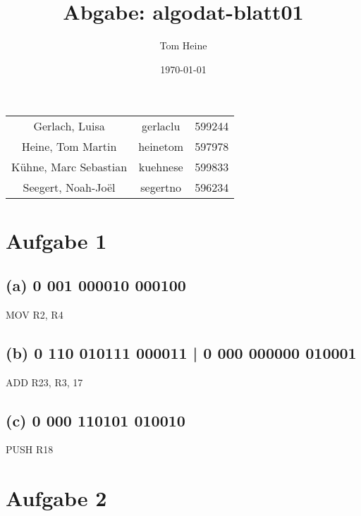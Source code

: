 \documentclass[12pt,a4paper]{scrartcl}
\author{Tom Heine}
\title{Abgabe: algodat-blatt01}
\date{\today}
\begin{document}
	\newpage
	\begin{center}
		\begin{tabular}{ccc}
			Gerlach, Luisa&gerlaclu&599244\\
			Heine, Tom Martin&heinetom&597978\\
			Kühne, Marc Sebastian&kuehnese&599833\\
			Seegert, Noah-Joël&segertno&596234
		\end{tabular}
	\end{center}
	\section*{Aufgabe 1}
	\subsection*{(a) 0 001 000010 000100}
		MOV R2, R4
	\subsection*{(b) 0 110 010111 000011 |
					 0 000 000000 010001}
		ADD R23, R3, 17
	\subsection*{(c) 0 000 110101 010010}
		PUSH R18
	\newpage
	\section*{Aufgabe 2}
	
\end{document}
